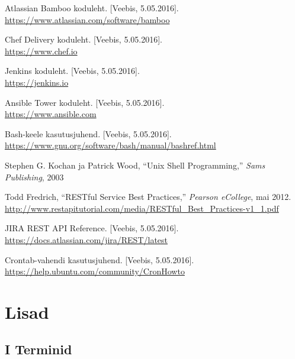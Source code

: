 \documentclass[12pt]{report}
\begin{document}
  \begin{thebibliography}{9}
    \label{kasutatud-materjalid}
    
    Atlassian Bamboo koduleht. [Veebis, 5.05.2016].\\
    \url{https://www.atlassian.com/software/bamboo}
    
    Chef Delivery koduleht. [Veebis, 5.05.2016].\\
    \url{https://www.chef.io}
  
    Jenkins koduleht. [Veebis, 5.05.2016].\\
    \url{https://jenkins.io}
  
    Ansible Tower koduleht. [Veebis, 5.05.2016].\\
    \url{https://www.ansible.com}
  
    Bash-keele kasutusjuhend. [Veebis, 5.05.2016].\\
    \url{https://www.gnu.org/software/bash/manual/bashref.html}
    
     Stephen G. Kochan ja Patrick Wood, ``Unix Shell Programming,'' \textit{Sams Publishing}, 2003
    
    Todd Fredrich, ``RESTful Service Best Practices,'' \textit{Pearson eCollege}, mai 2012.\\
    \url{http://www.restapitutorial.com/media/RESTful_Best_Practices-v1_1.pdf}
    
    JIRA REST API Reference. [Veebis, 5.05.2016].\\
    \url{https://docs.atlassian.com/jira/REST/latest}
  
    Crontab-vahendi kasutusjuhend. [Veebis, 5.05.2016].\\
    \url{https://help.ubuntu.com/community/CronHowto}
 
  \end{thebibliography}

  \newpage
  
  \section*{Lisad}
  \label{lisad}
  
  \subsection*{I Terminid}
  \label{terms}
  
\end{document}
